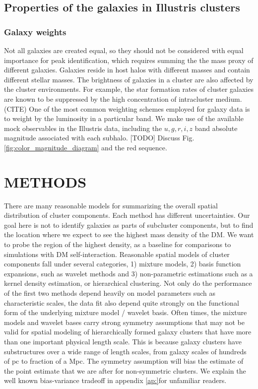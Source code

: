 \subsection{Properties of the galaxies in Illustris clusters}
\subsubsection{Galaxy weights}
\label{subsubsec:galaxy_weights}

Not all galaxies are created equal, so they should not be considered with equal
importance for peak identification, which requires summing the
the mass proxy of different galaxies. 
Galaxies reside in host halos with different masses and 
contain different stellar masses. The brightness of galaxies in a cluster are 
also affected by the cluster environments.
For example, the star formation rates of cluster galaxies are known to be 
suppressed by the high concentration of intracluster medium. (CITE)
One of the most common weighting schemes employed for galaxy data is to weight
by the luminosity in a particular band.
We make use of the available mock observables in the Illustris data, including 
the $u, g, r, i, z$ band absolute magnitude associated with each subhalo. 
[TODO] Discuss Fig. \ref{fig:color_magnitude_diagram} and the red sequence.



\section{METHODS}\label{sec:methods}

There are many reasonable models for summarizing the overall spatial
distribution of cluster components. Each method has different uncertainties.
Our goal here is   
not to identify galaxies as parts of subcluster components,
but to find the location where we expect to see the highest mass density of the
DM. We want to probe the region of the highest density, as a baseline for
comparisons to simulations with DM self-interaction. 
Reasonable spatial models of cluster components 
fall under several categories, 1) mixture models, 2) basis function
expansions, such as wavelet methods \citep{Jauzac2014} and 3) non-parametric estimations 
such as a kernel density estimation, or hierarchical clustering. 
Not only do the performance of the 
first two methods depend heavily on model parameters such as characteristic 
scales, 
the data fit also depend quite strongly on the functional form of 
the underlying mixture model / wavelet basis. Often times, 
the mixture models and wavelet bases 
carry strong symmetry assumptions that may not be valid for spatial modeling of 
hierarchically formed galaxy clusters that have more than one important physical 
length scale. 
This is because galaxy clusters have substructures over a wide range of length
scales, from galaxy scales of hundreds of pc to fraction of a Mpc. 
The symmetry assumption will bias the estimate of the point estimate that we
are after for non-symmetric clusters.
We explain the well known bias-variance tradeoff in appendix \ref{ap:}for unfamiliar
readers.


